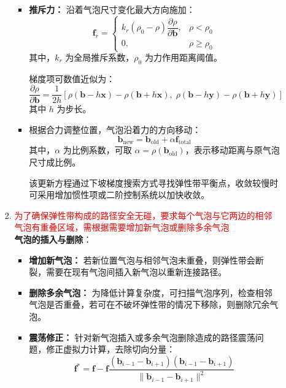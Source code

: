 \documentclass[../main.tex]{subfiles}
\begin{document}
\begin{enumerate}
\begin{itemize}
\begin{enumerate}
\begin{itemize}
        \item \textbf{推斥力：} 沿着气泡尺寸变化最大方向施加：
        \[
            \mathbf{f}_r =
            \begin{cases}
                k_r (\rho_0 - \rho)\dfrac{\partial \rho}{\partial \mathbf{b}}, & \rho < \rho_0 \\
                0, & \rho \geq \rho_0
            \end{cases}
        \]
        其中，$k_r$ 为全局推斥系数，$\rho_0$ 为力作用距离阈值。

        梯度项可数值近似为：
        \[
            \dfrac{\partial \rho}{\partial \mathbf{b}} = 
            \dfrac{1}{2h} 
            \left[
            \rho(\mathbf{b} - h\mathbf{x}) - \rho(\mathbf{b} + h\mathbf{x}),\;
            \rho(\mathbf{b} - h\mathbf{y}) - \rho(\mathbf{b} + h\mathbf{y})
            \right]
        \]
        其中 $h$ 为步长。\\
    \item 根据合力调整位置，气泡沿着力的方向移动：
    \[
        \mathbf{b}_{\text{new}} = \mathbf{b}_{\text{old}} + \alpha \mathbf{f}_{\text{total}}
    \]
    其中，$\alpha$ 为比例系数，可取 $\alpha = \rho(\mathbf{b}_{\text{old}})$，表示移动距离与原气泡尺寸成比例。

    该更新方程通过下坡梯度搜索方式寻找弹性带平衡点，收敛较慢时可采用增加惯性项或二阶控制系统以加快收敛。
    \end{itemize}
    
    \item \textcolor{red}{为了确保弹性带构成的路径安全无碰，要求每个气泡与它两边的相邻气泡有重叠区域，需根据需要增加新气泡或删除多余气泡}\\\textbf{气泡的插入与删除}：
    \begin{itemize}
        \item \textbf{增加新气泡：} 若新位置气泡与相邻气泡未重叠，则弹性带会断裂，需要在现有气泡间插入新气泡以重新连接路径。
        \item \textbf{删除多余气泡：} 为降低计算复杂度，可扫描气泡序列，检查相邻气泡是否重叠，若可在不破坏弹性带的情况下移除，则删除冗余气泡。
        \item \textbf{震荡修正：} 针对新气泡插入或多余气泡删除造成的路径震荡问题，修正虚拟力计算，去除切向分量：
        \[
            \mathbf{f}^* = \mathbf{f} -
            \mathbf{f} \dfrac{(\mathbf{b}_{i-1} - \mathbf{b}_{i+1})(\mathbf{b}_{i-1} - \mathbf{b}_{i+1})}
            {\|\mathbf{b}_{i-1} - \mathbf{b}_{i+1}\|^2}
        \]
    \end{itemize}
\end{enumerate}


\end{itemize}
\end{enumerate}
\end{document}
